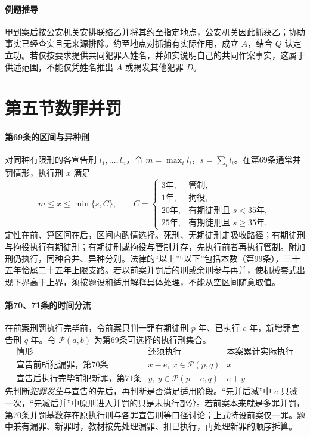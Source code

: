 \paragraph{例题推导}
甲到案后按公安机关安排联络乙并将其约至指定地点，公安机关因此抓获乙；协助事实已经查实且无来源排除。约至地点对抓捕有实际作用，成立 \(A\)，结合 \(Q\) 认定立功。若仅按要求提供共同犯罪人姓名，并如实说明自己的共同作案事实，这属于供述范围，不能仅凭姓名推出 \(A\) 或揭发其他犯罪 \(D\)。

\section{第五节\quad 数罪并罚}
\paragraph{第69条的区间与异种刑}
对同种有限刑的各宣告刑 \(l_1,\ldots,l_n\)，令 \(m=\max_i l_i\)，\(s=\sum_i l_i\)。在第69条通常并罚情形，执行刑 \(x\) 满足
\[
 m\le x\le \min\{s,C\},\qquad
 C=\begin{cases}
 3\text{年},&\text{管制},\\
 1\text{年},&\text{拘役},\\
 20\text{年},&\text{有期徒刑且 }s<35\text{年},\\
 25\text{年},&\text{有期徒刑且 }s\ge35\text{年}.
 \end{cases}
\]
定性在前、算区间在后，区间内酌情选择。死刑、无期徒刑走吸收路径；有期徒刑与拘役执行有期徒刑；有期徒刑或拘役与管制并存，先执行前者再执行管制。附加刑仍执行，同种合并、异种分别。法律的“以上”“以下”包括本数（第99条），三十五年恰属二十五年上限支路。若以前案并罚后的刑或余刑参与再并，使机械套式出现下界高于上界，须按题设和适用解释具体处理，不能从空区间随意取值。

\paragraph{第70、71条的时间分流}
在前案刑罚执行完毕前，令前案只判一罪有期徒刑 \(p\) 年、已执行 \(e\) 年，新增罪宣告刑 \(q\) 年。令 \(\mathcal P(a,b)\) 为第69条可选择的执行刑集合。
\[
\begin{array}{l|c|c}
\text{情形}&\text{还须执行}&\text{本案累计实际执行}\\ \hline
\text{宣告前所犯漏罪，第70条}&x-e,\ x\in\mathcal P(p,q)&x\\
\text{宣告后执行完毕前犯新罪，第71条}&y,\ y\in\mathcal P(p-e,q)&e+y
\end{array}
\]
先判断\emph{犯罪发生}与宣告的先后，再判断是否满足适用阶段。“先并后减”中 \(e\) 只减一次，“先减后并”中原刑进入并罚的只是未执行部分。若前案本来就是多罪并罚，第70条并罚基数存在原执行刑与各罪宣告刑等口径讨论；上式特设前案仅一罪。题中兼有漏罪、新罪时，教材按先处理漏罪、扣已执行，再处理新罪的顺序拆算。

